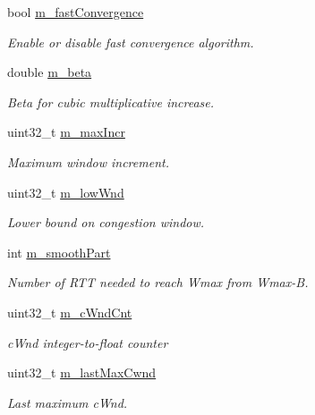 \begin{DoxyCompactItemize}
\item 
bool \hyperlink{classns3_1_1TcpBic_a034d8e16b688a2c58b5d2213aa5c3b7b}{m\+\_\+fast\+Convergence}
\begin{DoxyCompactList}\small\item\em Enable or disable fast convergence algorithm. \end{DoxyCompactList}\item 
double \hyperlink{classns3_1_1TcpBic_a899269934e13c92129fec020cc09256e}{m\+\_\+beta}
\begin{DoxyCompactList}\small\item\em Beta for cubic multiplicative increase. \end{DoxyCompactList}\item 
uint32\+\_\+t \hyperlink{classns3_1_1TcpBic_a79db4e8443cc0a27388a80566327a5a0}{m\+\_\+max\+Incr}
\begin{DoxyCompactList}\small\item\em Maximum window increment. \end{DoxyCompactList}\item 
uint32\+\_\+t \hyperlink{classns3_1_1TcpBic_a1a7a6a7c186075fba672ff3328eb85ec}{m\+\_\+low\+Wnd}
\begin{DoxyCompactList}\small\item\em Lower bound on congestion window. \end{DoxyCompactList}\item 
int \hyperlink{classns3_1_1TcpBic_a69437c77ce1d0e51238f51c262d58bf1}{m\+\_\+smooth\+Part}
\begin{DoxyCompactList}\small\item\em Number of R\+TT needed to reach Wmax from Wmax-\/B. \end{DoxyCompactList}\item 
uint32\+\_\+t \hyperlink{classns3_1_1TcpBic_ae83b19da3bfd61fd85d71f2f6e39a51b}{m\+\_\+c\+Wnd\+Cnt}
\begin{DoxyCompactList}\small\item\em c\+Wnd integer-\/to-\/float counter \end{DoxyCompactList}\item 
uint32\+\_\+t \hyperlink{classns3_1_1TcpBic_a082025c05e83dcddab77a6e3209cd4eb}{m\+\_\+last\+Max\+Cwnd}
\begin{DoxyCompactList}\small\item\em Last maximum c\+Wnd. \end{DoxyCompactList}\item 

\end{DoxyCompactItemize}
